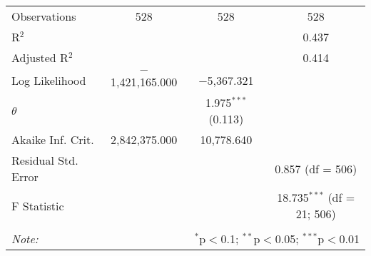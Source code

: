 \begin{table}[!htbp]
\begin{tabular}{@{\extracolsep{5pt}}lccc}
Observations & 528 & 528 & 528 \\ 
R$^{2}$ &  &  & 0.437 \\ 
Adjusted R$^{2}$ &  &  & 0.414 \\ 
Log Likelihood & $-$1,421,165.000 & $-$5,367.321 &  \\ 
$\theta$ &  & 1.975$^{***}$  (0.113) &  \\ 
Akaike Inf. Crit. & 2,842,375.000 & 10,778.640 &  \\ 
Residual Std. Error &  &  & 0.857 (df = 506) \\ 
F Statistic &  &  & 18.735$^{***}$ (df = 21; 506) \\ 
\hline 
\hline \\[-1.8ex] 
\textit{Note:}  & \multicolumn{3}{r}{$^{*}$p$<$0.1; $^{**}$p$<$0.05; $^{***}$p$<$0.01} \\ 
\end{tabular} 
\end{table} 
